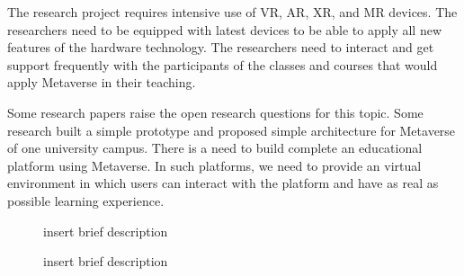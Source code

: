 \documentclass[
    ngerman,american
    ]{scrartcl}
\begin{document}
	
	\sectionResources
	\sectionResourcesDescription
	The research project requires intensive use of VR, AR, XR, and MR devices. The researchers need to be equipped with latest 
	devices to be able to apply all new features of the hardware technology. The researchers need to interact and get support frequently 
	with the participants of the classes and courses that would apply Metaverse in their teaching.
      

        \sectionSource
        \sectionSourceDescription
        Some research papers raise the open
        research questions for this topic. Some research built a simple prototype and proposed simple architecture for Metaverse of one university campus. There is a need
        to build complete an educational platform using Metaverse. In such platforms, we need to provide an virtual environment in which users can interact with 
        the platform and have as real as possible learning experience. 

        \begin{description}
        \item[\cite{park_meta_taxonomy_2022}] insert brief description
        \item[\cite{hwang_meta_ai_2022}] insert brief description
        \item[\cite{bokyung_meta_ed_2022}]
        \item[\cite{mystakidis_meta_encyclopedia_2022}]
        \item[\cite{tlili_metaed_2022}]
        \item[\cite{duan_metaed_2021}]
        \end{description}
      	\printbibliography
    
\end{document}
